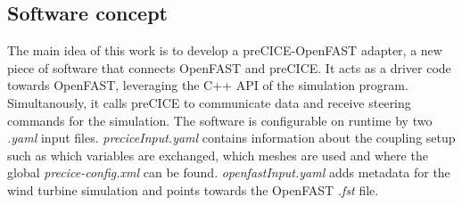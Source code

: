 \subsection{Software concept}

The main idea of this work is to develop a preCICE-OpenFAST adapter, a new piece of software that connects OpenFAST and preCICE. It acts as a driver code towards OpenFAST, leveraging the C++ API of the simulation program. Simultanously, it calls preCICE to communicate data and receive steering commands for the simulation. The software is configurable on runtime by two \textit{.yaml} input files. \textit{preciceInput.yaml} contains information about the coupling setup such as which variables are exchanged, which meshes are used and where the global \textit{precice-config.xml} can be found. \textit{openfastInput.yaml} adds metadata for the wind turbine simulation and points towards the OpenFAST \textit{.fst} file.\\

